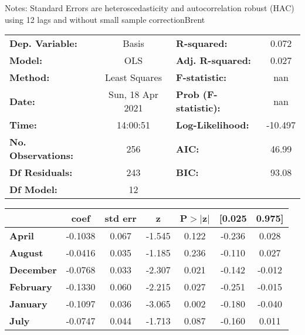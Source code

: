 Notes: \newline
 [1] Standard Errors are heteroscedasticity and autocorrelation robust (HAC) using 12 lags and without small sample correctionBrent\begin{center}
\begin{tabular}{lclc}
\toprule
\textbf{Dep. Variable:}    &      Basis       & \textbf{  R-squared:         } &     0.072   \\
\textbf{Model:}            &       OLS        & \textbf{  Adj. R-squared:    } &     0.027   \\
\textbf{Method:}           &  Least Squares   & \textbf{  F-statistic:       } &       nan   \\
\textbf{Date:}             & Sun, 18 Apr 2021 & \textbf{  Prob (F-statistic):} &      nan    \\
\textbf{Time:}             &     14:00:51     & \textbf{  Log-Likelihood:    } &   -10.497   \\
\textbf{No. Observations:} &         256      & \textbf{  AIC:               } &     46.99   \\
\textbf{Df Residuals:}     &         243      & \textbf{  BIC:               } &     93.08   \\
\textbf{Df Model:}         &          12      & \textbf{                     } &             \\
\bottomrule
\end{tabular}
\begin{tabular}{lcccccc}
                   & \textbf{coef} & \textbf{std err} & \textbf{z} & \textbf{P$> |$z$|$} & \textbf{[0.025} & \textbf{0.975]}  \\
\midrule
\textbf{April}     &      -0.1038  &        0.067     &    -1.545  &         0.122        &       -0.236    &        0.028     \\
\textbf{August}    &      -0.0416  &        0.035     &    -1.185  &         0.236        &       -0.110    &        0.027     \\
\textbf{December}  &      -0.0768  &        0.033     &    -2.307  &         0.021        &       -0.142    &       -0.012     \\
\textbf{February}  &      -0.1330  &        0.060     &    -2.215  &         0.027        &       -0.251    &       -0.015     \\
\textbf{January}   &      -0.1097  &        0.036     &    -3.065  &         0.002        &       -0.180    &       -0.040     \\
\textbf{July}      &      -0.0747  &        0.044     &    -1.713  &         0.087        &       -0.160    &        0.011     \\

\end{tabular}
\end{center}
